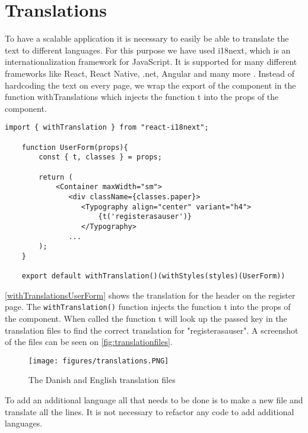 \section{Translations}
To have a scalable application it is necessary to easily be able to translate the text to different languages.
For this purpose we have used i18next, which is an internationalization framework for JavaScript.
It is supported for many different frameworks like React, React Native, .net, Angular and many more \cite{react-i18next}.
Instead of hardcoding the text on every page, we wrap the export of the component in the function withTranslations which injects the function t into the props of the component.  

\begin{lstlisting}[caption={Translated header when registering as a user.}, captionpos=b, label={withTranslationsUserForm}]
    import { withTranslation } from "react-i18next";

    function UserForm(props){
        const { t, classes } = props;

        return (
            <Container maxWidth="sm">
               <div className={classes.paper}>
                  <Typography align="center" variant="h4">
                      {t('registerasauser')}
                  </Typography>
               ...
        );
    }

    export default withTranslation()(withStyles(styles)(UserForm))
\end{lstlisting}
\noindent
\autoref{withTranslationsUserForm} shows the translation for the header on the register page.
The \texttt{withTranslation()} function injects the function t into the props of the component. When called the function t will look up the passed key in the translation files to find the correct translation for "registerasauser". 
A screenshot of the files can be seen on \autoref{fig:translationfiles}.
\begin{figure}
    \centering
    \texttt{[image: figures/translations.PNG]}
    \caption{The Danish and English translation files}
    \label{fig:translationfiles}
\end{figure}
\noindent
To add an additional language all that needs to be done is to make a new file and translate all the lines. 
It is not necessary to refactor any code to add additional languages.
